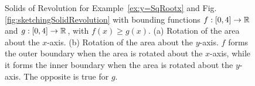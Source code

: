 \begin{figure}[hbt]%
\centering
{}%
%
    \caption[]{Solids of Revolution for Example~\ref{ex:y=SqRootx} and Fig.\ref{fig:sketchingSolidRevolution} with bounding functions $f:[0, 4]\to \mathbb R$ and $g:[0, 4]\to \mathbb R$, with $f(x) \ge g(x)$. (a) Rotation of the area about the $x$-axis. (b) Rotation of the area about the $y$-axis. $f$ forms the outer boundary when the area is rotated about the $x$-axis, while it forms the inner boundary when the area is rotated about the $y$-axis. The opposite is true for $g$. }
    \label{fig:solidsRevolutionFequalsSqRtxGequlasZeroPt5x}
\end{figure}



